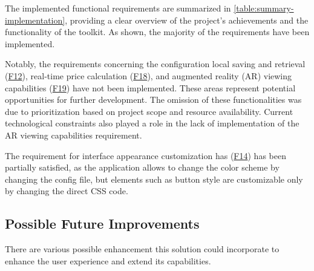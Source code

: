The implemented functional requirements are summarized in \autoref{table:summary-implementation}, providing a clear overview of the project's achievements and the functionality of the toolkit. As shown, the majority of the requirements have been implemented.

Notably, the requirements concerning the configuration local saving and retrieval (\hyperref[itm:F12]{F12}), real-time price calculation (\hyperref[itm:F18]{F18}), and augmented reality (AR) viewing capabilities (\hyperref[itm:F19]{F19}) have not been implemented. These areas represent potential opportunities for further development. The omission of these functionalities was due to prioritization based on project scope and resource availability. Current technological constraints also played a role in the lack of implementation of the AR viewing capabilities requirement.

The requirement for interface appearance customization has (\hyperref[itm:F14]{F14}) has been partially satisfied, as the application allows to change the color scheme by changing the config file, but elements such as button style are customizable only by changing the direct CSS code.

\subsection{Possible Future Improvements} \label{section:improvements}

There are various possible enhancement this solution could incorporate to enhance the user experience and extend its capabilities.

